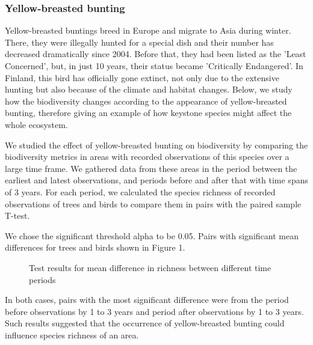 \documentclass{article}
\begin{document}
\subsubsection{Yellow-breasted bunting}
Yellow-breasted buntings breed in Europe and migrate to Asia during winter. There, they were illegally hunted for a special dish and their number has decreased dramatically since 2004. Before that, they had been listed as the 'Least Concerned', but, in just 10 years, their status became 'Critically Endangered'. In Finland, this bird has officially gone extinct, not only due to the extensive hunting but also because of the climate and habitat changes. Below, we study how the biodiversity changes according to the appearance of yellow-breasted bunting, therefore giving an example of how keystone species might affect the whole ecosystem.
\par
We studied the effect of yellow-breasted bunting on biodiversity by comparing the biodiversity metrics in areas with recorded observations of this species over a large time frame. We gathered data from these areas in the period between the earliest and latest observations, and periods before and after that with time spans of 3 years. For each period, we calculated the species richness of recorded observations of trees and birds to compare them in pairs with the paired sample T-test.
\par
We chose the significant threshold alpha to be 0.05. Pairs with significant mean differences for trees and birds shown in Figure 1.
\par
\begin{figure}[h]
	\vspace*{-3mm}
	\centering
	\caption{Test results for mean difference in richness between different time periods}
	\vspace*{-1mm}
\end{figure}
\noindent
In both cases, pairs with the most significant difference were from the period before observations by 1 to 3 years and period after observations by 1 to 3 years. Such results suggested that the occurrence of yellow-breasted bunting could influence species richness of an area.
\end{document}
